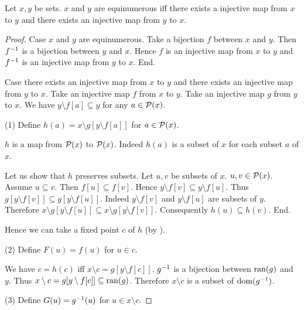 \documentclass{article}
\begin{document}
 \begin{forthel}

   \begin{theorem*}[title=Cantor-Schröder-Bernstein,id=CSB]
      Let $x,y$ be sets.
      $x$ and $y$ are equinumerous iff there exists a injective map from $x$ to
      $y$ and there exists an injective map from $y$ to $x$.
    \end{theorem*}
    \begin{proof}
      Case $x$ and $y$ are equinumerous.
        Take a bijection $f$ between $x$ and $y$.
        Then $f^{-1}$ is a bijection between $y$ and $x$.
        Hence $f$ is an injective map from $x$ to $y$ and $f^{-1}$ is an
        injective map from $y$ to $x$.
      End.

      Case there exists an injective map from $x$ to $y$ and there exists an
      injective map from $y$ to $x$.
        Take an injective map $f$ from $x$ to $y$.
        Take an injective map $g$ from $y$ to $x$.
        We have $y \setminus f[a] \subseteq y$ for any $a \in {\cal P}(x)$.

        (1) Define $h(a) = x \setminus g[y \setminus f[a]]$ for $a \in {\cal P}(x)$.

        $h$ is a map from ${\cal P}(x)$ to ${\cal P}(x)$.
        Indeed $h(a)$ is a subset of $x$ for each subset $a$ of $x$.

        Let us show that $h$ preserves subsets.
          Let $u, v$ be subsets of $x$. $u,v \in {\cal P}(x)$.
          Assume $u \subseteq v$.
          Then $f[u] \subseteq f[v]$.
          Hence $y \setminus f[v] \subseteq y \setminus f[u]$.
          Thus $g[y \setminus f[v]] \subseteq g[y \setminus f[u]]$.
          Indeed $y \setminus f[v]$ and $y \setminus f[u]$ are subsets of $y$.
          Therefore $x \setminus g[y \setminus f[u]] \subseteq
          x \setminus g[y \setminus f[v]]$.
          Consequently $h(u) \subseteq h(v)$.
        End.

        Hence we can take a fixed point $c$ of $h$ (by ).

        (2) Define $F(u) = f(u)$ for $u \in c$.

        We have $c = h(c)$ iff $x \setminus c = g[y \setminus f[c]]$.
        $g^{-1}$ is a bijection between $\operatorname{ran}(g)$ and $y$.
        Thus $x \setminus c = g[y \setminus f[c]] \subseteq \operatorname{ran}(g)$.
        Therefore $x \setminus c$ is a subset of $\operatorname{dom}(g^{-1})$.

        (3) Define $G(u) = g^{-1}(u)$ for $u \in x \setminus c$.


\end{proof}
\end{forthel}
\end{document}
